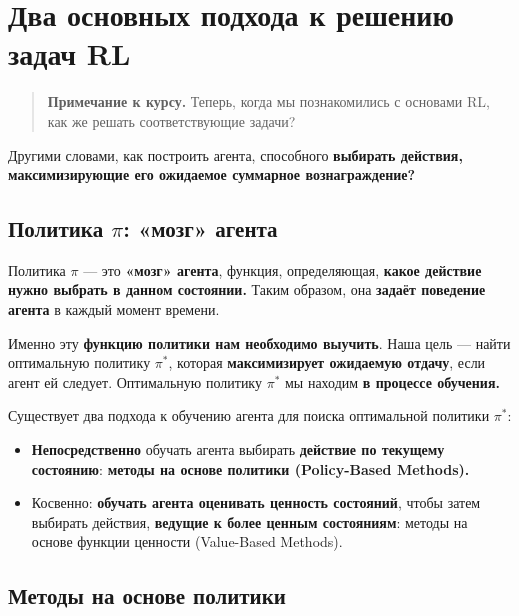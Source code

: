 \documentclass[11pt,a4paper]{article}
\begin{document}
\section{Два основных подхода к решению задач RL}\label{two-main-approaches-for-solving-rl-problems}

\begin{quote}
\textbf{Примечание к курсу.} Теперь, когда мы познакомились с основами RL, как же решать соответствующие задачи?
\end{quote}

Другими словами, как построить агента, способного \textbf{выбирать действия, максимизирующие его ожидаемое суммарное вознаграждение?}

\subsection{Политика \texorpdfstring{$\pi$}{pi}: «мозг» агента}\label{the-policy-ux3c0-the-agents-brain}

Политика \textbf{$\pi$} --- это \textbf{«мозг» агента}, функция, определяющая, \textbf{какое действие нужно выбрать в данном состоянии.} Таким образом, она \textbf{задаёт поведение агента} в каждый момент времени.


Именно эту \textbf{функцию политики нам необходимо выучить}. Наша цель --- найти оптимальную политику $\pi^*$, которая \textbf{максимизирует ожидаемую отдачу}, если агент ей следует. Оптимальную политику $\pi^*$ мы находим \textbf{в процессе обучения.}

Существует два подхода к обучению агента для поиска оптимальной политики $\pi^*$:

\begin{itemize}
\tightlist
\item
  \textbf{Непосредственно} обучать агента выбирать \textbf{действие по текущему состоянию}: \textbf{методы на основе политики (Policy-Based Methods).}
\item
  Косвенно: \textbf{обучать агента оценивать ценность состояний}, чтобы затем выбирать действия, \textbf{ведущие к более ценным состояниям}: методы на основе функции ценности (Value-Based Methods).
\end{itemize}

\subsection{Методы на основе политики}\label{policy-based-methods}
\end{document}
